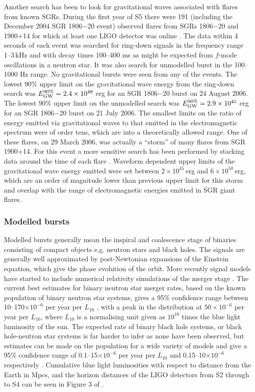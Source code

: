 \documentclass{article}
\begin{document}
Another search has been to look for gravitational waves associated with flares
from known SGRs. During the first year of S5 there were 191 (including the
December 2004 SGR 1806$-$20 event) observed flares from SGRs 1806$-$20 and
1900+14 for which at least one LIGO detector was online \cite{Abbott:2008h}. The
data within 4 seconds of each event was searched for ring-down signals in the
frequency range 1--3\,kHz and with decay times 100--400 ms as might be expected
from $f$-mode oscillations in a neutron star. It was also search for unmodelled
burst in the 100--1000 Hz range. No gravitational bursts were seen from any of
the events. The lowest 90\% upper limit on the gravitational wave energy from
the ring-down search was $E_{\rm GW}^{90\%} = 2.4\times10^{48}$ erg for an SGR
1806$-$20 burst on 24 August 2006. The lowest 90\% upper limit on the unmodelled
search was $E_{\rm GW}^{90\%} = 2.9\times10^{45}$ erg for an SGR 1806$-$20
burst on 21 July 2006. The smallest limits on the ratio of energy emitted via
gravitational waves to that emitted in the electromagnetic spectrum were of
order tens, which are into a theoretically allowed range. One of these flares,
on 29 March 2006, was actually a ``storm'' of many flares from SGR\,1900+14.
For this event a more sensitive search has been performed by stacking data
around the time of each flare \cite{Abbott:2009c}. Waveform dependent upper
limits of the gravitational wave energy emitted were set between
$2\times10^{45}$\,erg and $6\times10^{50}$\,erg, which are an order of magnitude
lower than previous upper limit for this storm and overlap with the range of
electromagnetic energies emitted in SGR giant flares. 

\subsubsection{Modelled bursts}
Modelled bursts generally mean the inspiral and coalescence stage of binaries
consisting of compact objects e.g. neutron stars and black holes. The signals
are generally well approximated by post-Newtonian expansions of the Einstein
equation, which give the phase evolution of the orbit. More recently signal
models have started to include numerical relativity simulations of the
merger stage \cite{Aylott:2009}. The current best estimates for binary neutron
star merger rates, based on the known population of binary neutron star systems,
gives a 95\% confidence range between 10--170$\times10^{-6}$ per year per 
$L_{10}$ \cite{Kalogera:2004a, Kalogera:2004b}, with a peak in the distribution
at $50\times10^{-6}$ per year per $L_{10}$, where $L_{10}$ is a normalising unit
given as $10^{10}$ times the blue light luminosity of the sun. The expected rate
of binary black hole systems, or black hole-neutron star systems is far harder
to infer as none have been observed, but estimates can be made on the population
for a wide variety of models and give a 95\% confidence range of
0.1--15$\times10^{-6}$ per year per $L_{10}$ and 0.15--10$\times10^{-6}$
respectively \cite{OShaughnessy:2005, OShaughnessy:2008, Abbott:2008a}.
Cumulative blue light luminosities with respect to distance from the Earth in
Mpcs, and the horizon distances of the LIGO detectors from S2 through to S4
can be seen in Figure 3 of \cite{Abbott:2008a}.
\end{document}
